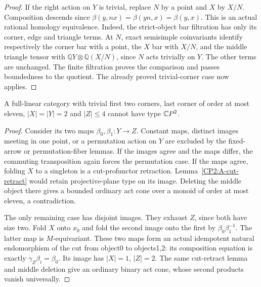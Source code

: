 \begin{proof}
If the right action on $Y$ is trivial, replace $N$ by
a point and $X$ by $X/N$. Composition descends since
$\beta(y,nx)=\beta(yn,x)=\beta(y,x)$. This is an
actual rational homology equivalence. Indeed, the
strict-object bar filtration has only its corner,
edge and triangle terms. At $N$, exact semisimple
coinvariants identify respectively the corner bar
with a point, the $X$ bar with $X/N$, and the middle
triangle tensor with
$\mathbb QY\otimes\mathbb Q(X/N)$, since $N$ acts
trivially on $Y$. The other terms are unchanged.
The finite filtration proves the comparison and
passes boundedness to the quotient. The already
proved trivial-corner case now applies.
\end{proof}

\begin{proposition}
\label{CP2:A-two-two-four-incoming}
A full-linear category with trivial first two corners,
last corner of order at most eleven, $|X|=|Y|=2$ and
$|Z|\leq4$ cannot have type $\mathbb{C}P^2$.
\end{proposition}
\begin{proof}
Consider its two maps $\beta_0,\beta_1:Y\to Z$.
Constant maps, distinct images meeting in one point,
or a permutation action on $Y$ are excluded by the
fixed-arrow or permutation-fiber lemmas. If the images
agree and the maps differ, the commuting transposition
again forces the permutation case. If the maps agree,
folding $X$ to a singleton is a cut-profunctor retraction.
Lemma~\ref{CP2:A-cut-retract} would retain projective-plane
type on its image. Deleting the middle object there
gives a bounded ordinary act cone over a monoid of
order at most eleven, a contradiction.

The only remaining case has disjoint images. They
exhaust $Z$, since both have size two. Fold $X$ onto
$x_0$ and fold the second image onto the first by
$\beta_0\beta_1^{-1}$. The latter map is $M$-equivariant.
These two maps form an actual idempotent natural
endomorphism of the cut from object0 to objects1,2:
its composition equation is exactly
$\gamma_Z\beta_i=\beta_0$.
Its image has $|X|=1$, $|Z|=2$. The same cut-retract
lemma and middle deletion give an ordinary binary act
cone, whose second products vanish universally.
\end{proof}


